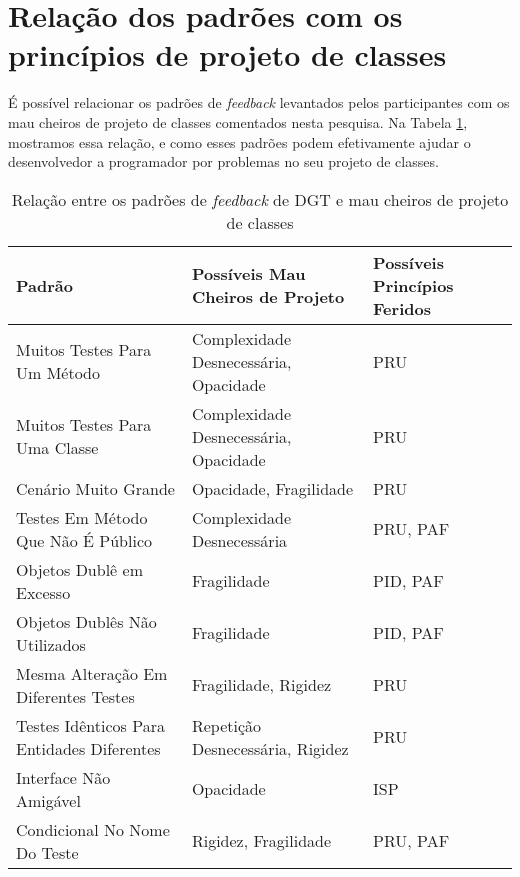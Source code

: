 \section{Relação dos padrões com os princípios de projeto de classes}

É possível relacionar os padrões de \textit{feedback} levantados pelos participantes
com os mau cheiros de projeto de classes comentados nesta pesquisa. Na Tabela \ref{tab:relacao-padroes},
mostramos essa relação, e como esses padrões podem efetivamente ajudar o desenvolvedor
a programador por problemas no seu projeto de classes.


\begin{table}[h!]
	\centering
	\begin{tabular}{| p{7.5cm} | p{5cm} | p{2.5cm} | }
		\hline

		Padrão & Possíveis Mau Cheiros de Projeto & Possíveis Princípios Feridos\\
		
		\hline

		Muitos Testes Para Um Método                   & Complexidade Desnecessária, Opacidade   & PRU \\ \hline
		Muitos Testes Para Uma Classe                  & Complexidade Desnecessária, Opacidade   & PRU \\ \hline
		Cenário Muito Grande                           & Opacidade, Fragilidade                  & PRU \\ \hline
		Testes Em Método Que Não É Público             & Complexidade Desnecessária              & PRU, PAF \\ \hline
		Objetos Dublê em Excesso                       & Fragilidade                             & PID, PAF \\ \hline
		Objetos Dublês Não Utilizados                  & Fragilidade                             & PID, PAF \\ \hline
		Mesma Alteração Em Diferentes Testes           & Fragilidade, Rigidez                    & PRU \\ \hline
		Testes Idênticos Para Entidades Diferentes     & Repetição Desnecessária, Rigidez        & PRU  \\ \hline
		Interface Não Amigável                         & Opacidade                               & ISP \\ \hline
		Condicional No Nome Do Teste                   & Rigidez, Fragilidade                    & PRU, PAF \\

		\hline
		
	\end{tabular}
	\caption{Relação entre os padrões de \textit{feedback} de DGT e mau cheiros de projeto de classes}
	\label{tab:relacao-padroes}
\end{table}
